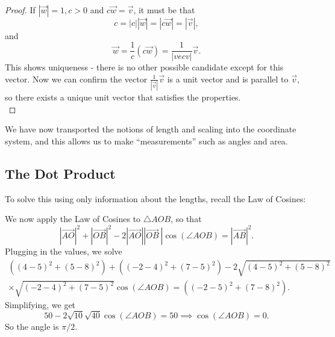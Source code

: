 \ \\
\begin{proof}
	If $|\vec{w}|=1, c>0$ and $c\vec{w}=\vec{v}$, it must be that \[
		c = |c||\vec{w}| = |c\vec{w}| = |\vec{v}|,
	\]
	and \[
		\vec{w} = \frac{1}{c}(c\vec{w}) = \frac{1}{|vec{v}|}\vec{v}.
	\] This shows uniqueness - there is no other possible candidate except for this vector. Now we can confirm the vector $\frac{1}{|\vec{v}|}\vec{v}$ is a unit vector and is parallel to $\vec{v}$, so there exists a unique unit vector that satisfies the properties.
	\\
\end{proof}
We have now transported the notions of length and scaling into the coordinate system, and this allows us to make ``measurements'' such as angles and area.

\subsection{The Dot Product}
To solve this using only information about the lengths, recall the Law of Cosines:


We now apply the Law of Cosines to $\triangle AOB$, so that\[
	|\overrightarrow{AO}|^2  +|\overrightarrow{OB}|^2- 2 |\overrightarrow{AO}| |\overrightarrow{OB} \ |\cos(\angle AOB) = |\overrightarrow{AB}|^2.
\]
Plugging in the values, we solve 
\begin{align*}
		((4-5)^2 + (5-8)^2) + ((-2-4)^2+(7-5)^2) - 2 \sqrt{(4-5)^2 + (5-8)^2} \\ \times \sqrt{(-2-4)^2+(7-5)^2} \cos(\angle AOB) = ((-2-5)^2+(7-8)^2).
\end{align*}
Simplifying, we get\[
	50 - 2 \sqrt{10} \sqrt{40} \cos(\angle AOB) = 50 \implies \cos(\angle AOB) = 0.
\]
So the angle is $\pi/2$.

